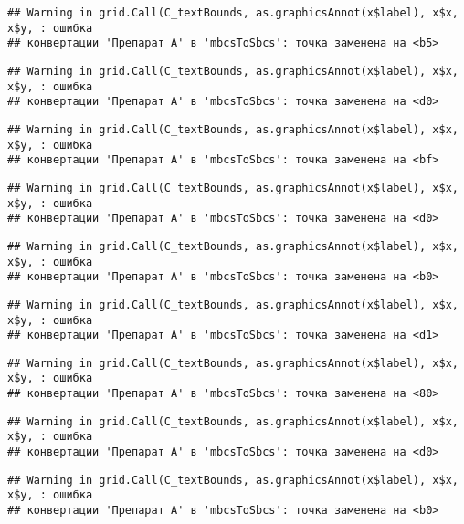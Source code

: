 \documentclass[
]{article}
\begin{document}
\begin{verbatim}
## Warning in grid.Call(C_textBounds, as.graphicsAnnot(x$label), x$x, x$y, : ошибка
## конвертации 'Препарат A' в 'mbcsToSbcs': точка заменена на <b5>
\end{verbatim}

\begin{verbatim}
## Warning in grid.Call(C_textBounds, as.graphicsAnnot(x$label), x$x, x$y, : ошибка
## конвертации 'Препарат A' в 'mbcsToSbcs': точка заменена на <d0>
\end{verbatim}

\begin{verbatim}
## Warning in grid.Call(C_textBounds, as.graphicsAnnot(x$label), x$x, x$y, : ошибка
## конвертации 'Препарат A' в 'mbcsToSbcs': точка заменена на <bf>
\end{verbatim}

\begin{verbatim}
## Warning in grid.Call(C_textBounds, as.graphicsAnnot(x$label), x$x, x$y, : ошибка
## конвертации 'Препарат A' в 'mbcsToSbcs': точка заменена на <d0>
\end{verbatim}

\begin{verbatim}
## Warning in grid.Call(C_textBounds, as.graphicsAnnot(x$label), x$x, x$y, : ошибка
## конвертации 'Препарат A' в 'mbcsToSbcs': точка заменена на <b0>
\end{verbatim}

\begin{verbatim}
## Warning in grid.Call(C_textBounds, as.graphicsAnnot(x$label), x$x, x$y, : ошибка
## конвертации 'Препарат A' в 'mbcsToSbcs': точка заменена на <d1>
\end{verbatim}

\begin{verbatim}
## Warning in grid.Call(C_textBounds, as.graphicsAnnot(x$label), x$x, x$y, : ошибка
## конвертации 'Препарат A' в 'mbcsToSbcs': точка заменена на <80>
\end{verbatim}

\begin{verbatim}
## Warning in grid.Call(C_textBounds, as.graphicsAnnot(x$label), x$x, x$y, : ошибка
## конвертации 'Препарат A' в 'mbcsToSbcs': точка заменена на <d0>
\end{verbatim}

\begin{verbatim}
## Warning in grid.Call(C_textBounds, as.graphicsAnnot(x$label), x$x, x$y, : ошибка
## конвертации 'Препарат A' в 'mbcsToSbcs': точка заменена на <b0>
\end{verbatim}
\end{document}
